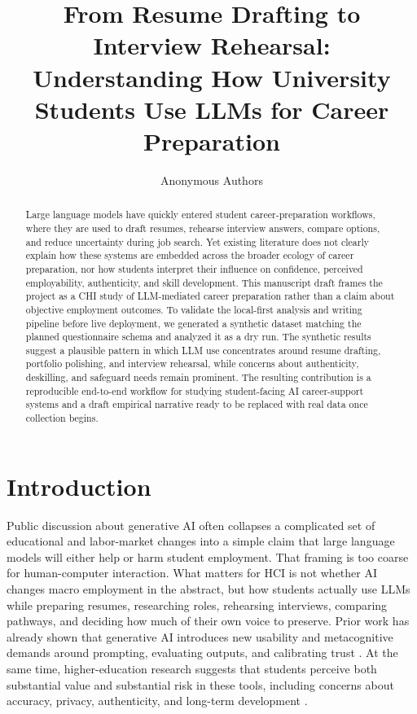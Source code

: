 \documentclass[sigconf]{acmart}
\title{From Resume Drafting to Interview Rehearsal: Understanding How University Students Use LLMs for Career Preparation}
\author{Anonymous Authors}
\affiliation{%
  \institution{Anonymous Institution}
  \city{Anonymous City}
  \country{Anonymous Country}
}
\begin{document}
\begin{abstract}
Large language models have quickly entered student career-preparation workflows, where they are used to draft resumes, rehearse interview answers, compare options, and reduce uncertainty during job search. Yet existing literature does not clearly explain how these systems are embedded across the broader ecology of career preparation, nor how students interpret their influence on confidence, perceived employability, authenticity, and skill development. This manuscript draft frames the project as a CHI study of LLM-mediated career preparation rather than a claim about objective employment outcomes. To validate the local-first analysis and writing pipeline before live deployment, we generated a synthetic dataset matching the planned questionnaire schema and analyzed it as a dry run. The synthetic results suggest a plausible pattern in which LLM use concentrates around resume drafting, portfolio polishing, and interview rehearsal, while concerns about authenticity, deskilling, and safeguard needs remain prominent. The resulting contribution is a reproducible end-to-end workflow for studying student-facing AI career-support systems and a draft empirical narrative ready to be replaced with real data once collection begins.
\end{abstract}

\maketitle

\section{Introduction}
Public discussion about generative AI often collapses a complicated set of educational and labor-market changes into a simple claim that large language models will either help or harm student employment. That framing is too coarse for human-computer interaction. What matters for HCI is not whether AI changes macro employment in the abstract, but how students actually use LLMs while preparing resumes, researching roles, rehearsing interviews, comparing pathways, and deciding how much of their own voice to preserve. Prior work has already shown that generative AI introduces new usability and metacognitive demands around prompting, evaluating outputs, and calibrating trust \cite{tankelevitch2024metacognitive}. At the same time, higher-education research suggests that students perceive both substantial value and substantial risk in these tools, including concerns about accuracy, privacy, authenticity, and long-term development \cite{chan2023studentsvoices,jochim2024teachingtesting}.
\end{document}
